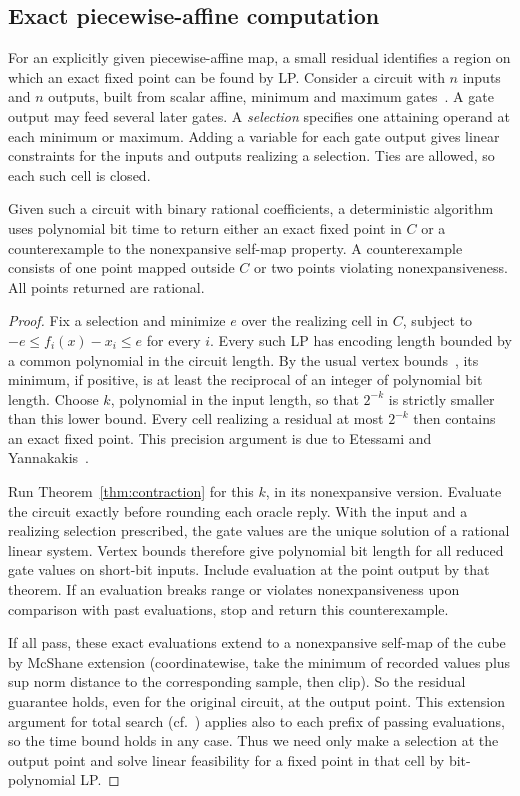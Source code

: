 \subsection{Exact piecewise-affine computation}

For an explicitly given piecewise-affine map, a small residual
identifies a region on which an exact fixed point can be found by
LP. Consider a circuit with \(n\) inputs and \(n\) outputs, built
from scalar affine, minimum and maximum gates~\cite{EY,FGMS}.
A gate output may feed several later gates. A \emph{selection}
specifies one attaining operand at each minimum or maximum.
Adding a variable for each gate output gives linear constraints for
the inputs and outputs realizing a selection. Ties are allowed, so
each such cell is closed.

\begin{corollary}\label{cor:pa}
Given such a circuit with binary rational coefficients, a
deterministic algorithm uses polynomial bit time to return either an
exact fixed point in \(C\) or a counterexample to the nonexpansive
self-map property. A counterexample consists of one point mapped
outside \(C\) or two points violating nonexpansiveness. All points
returned are rational.
\end{corollary}

\begin{proof}
Fix a selection and minimize \(e\) over the realizing cell in \(C\),
subject to \(-e\le f_i(x)-x_i\le e\) for every \(i\). Every such LP
has encoding length bounded by a common polynomial in the circuit
length. By the usual vertex bounds~\cite{GLS}, its minimum, if
positive, is at least the reciprocal of an integer of polynomial
bit length. Choose \(k\), polynomial in the input length, so that
\(2^{-k}\) is strictly smaller than this lower bound. Every cell
realizing a residual at most \(2^{-k}\) then contains an exact fixed
point. This precision argument is due to Etessami and
Yannakakis~\cite{EY}.

Run Theorem~\ref{thm:contraction}
for this \(k\), in its nonexpansive version.
Evaluate the circuit exactly before rounding each oracle reply.
With the input and a realizing selection prescribed, the gate values
are the unique solution of a rational linear system. Vertex bounds
therefore give polynomial bit length for all reduced gate values
on short-bit inputs.
Include evaluation at the point output by that theorem.
If an evaluation breaks range or violates nonexpansiveness
upon comparison with past evaluations, stop
and return this counterexample.

If all pass, these exact evaluations extend to
a nonexpansive self-map of the cube by McShane extension
\cite{McSh}
(coordinatewise, take the minimum of recorded
values plus sup norm distance to the corresponding sample,
then clip).
So the residual guarantee holds, even for the original circuit, at
the output point.
This extension argument for total search
(cf.~\cite{CLY})
applies also to each prefix of passing evaluations,
so the time bound holds in any case.
Thus we need only make a selection at the output point
and solve linear feasibility for a fixed point in that cell
by bit-polynomial LP.
\end{proof}

